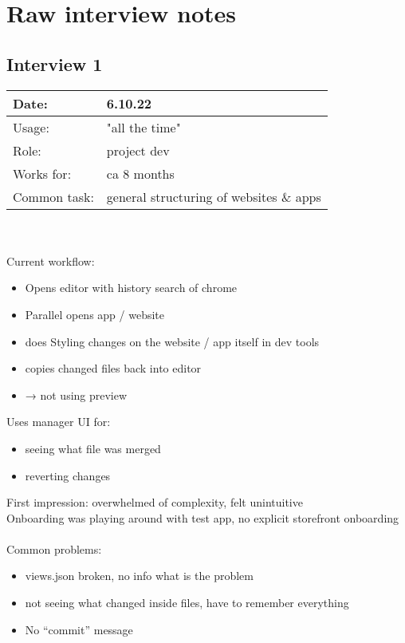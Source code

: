 \chapter{Raw interview notes}
\label{app:interviews}

\section{Interview 1}

\begin{tabularx}{\linewidth}{lX}
  Date: & 6.10.22 \\
  \hline
  Usage: & "all the time"\\
  \hline
  Role: & project dev \\
  \hline
  Works for: & ca 8 months \\
  \hline
  Common task: & general structuring of websites \& apps
\end{tabularx}
\\\\
Current workflow:
\begin{itemize}[nosep]
  \item Opens editor with history search of chrome
  \item Parallel opens app / website
  \item does Styling changes on the website / app itself in dev tools
  \item copies changed files back into editor
  \item → not using preview
\end{itemize}

Uses manager UI for:
\begin{itemize}[nosep]
  \item seeing what file was merged
  \item reverting changes
\end{itemize}

First impression: overwhelmed of complexity, felt unintuitive\\
Onboarding was playing around with test app, no explicit storefront onboarding
\\\\
Common problems:
\begin{itemize}[nosep]
  \item views.json broken, no info what is the problem
  \item not seeing what changed inside files, have to remember everything
  \item No “commit” message
\end{itemize}

